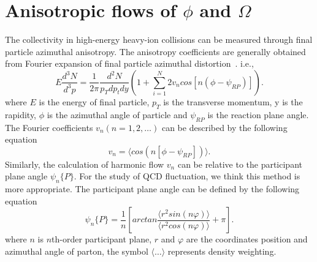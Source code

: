 \documentclass[11pt,a4paper,openany]{article}
\begin{document}
\section{Anisotropic flows of $\phi$ and $\Omega$}
The collectivity in high-energy heavy-ion collisions can be measured through final particle 
azimuthal anisotropy. The anisotropy coefficients are generally obtained from Fourier expansion
of final particle azimuthal distortion~\cite{malong}. i.e.,
\begin{equation}
  \label{eq:7}
  E\frac{d^{3}N}{d^{3}p} = \frac{1}{2\pi}\frac{d^{2}N}{p_{T}dp_{t}dy}\left(1+\sum^{N}_{i=1}{2v_{n}cos[n(\phi-\psi_{RP})]}\right).
\end{equation}
where $E$ is the energy of final particle, $p_{T}$ is the transverse momentum, y is the rapidity, 
$\phi$ is the azimuthal angle of particle and $\psi_{RP}$ is the reaction plane angle. The Fourier 
coefficients $v_{n}(n=1,2,\dots)$ can be described by the following equation
\begin{equation}
  \label{eq:8}
  v_{n} = \langle{cos(n[\phi-\psi_{RP}])}\rangle.
\end{equation}
Similarly, the calculation of harmonic flow $v_{n}$ can be relative to the participant plane angle
$\psi_{n}\{P\}$. For the study of QCD fluctuation, we think this method is more appropriate. The
participant plane angle can be defined by the following equation
\begin{equation}
  \label{eq:9}
  \psi_{n}\{P\} = \frac{1}{n}\left[arctan\frac{\langle{r^{2}sin(n\varphi)}\rangle}{\langle{r^{2}cos(n\varphi)}\rangle}+\pi\right].
\end{equation}
where $n$ is $n$th-order participant plane, $r$ and $\varphi$ are the coordinates position and 
azimuthal angle of parton, the symbol $\langle{\dots}\rangle$ represents density weighting.
\end{document}
